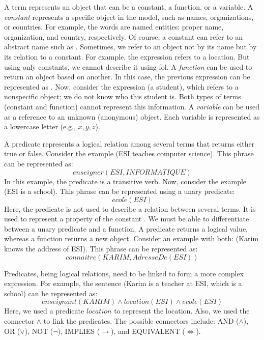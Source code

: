 \documentclass{KBook}
\begin{document}
A term represents an object that can be a constant, a function, or a variable. 
A \textit{constant} represents a specific object in the model, such as names, organizations, or countries.
For example, the words  are named entities: proper name, organization, and country, respectively.
Of course, a constant can refer to an abstract name such as .
Sometimes, we refer to an object not by its name but by its relation to a constant. 
For example, the expression  refers to a location. 
But using only constants, we cannot describe it using \ac{fol}. 
A \textit{function} can be used to return an object based on another. 
In this case, the previous expression can be represented as .
Now, consider the expression  (a student), which refers to a nonspecific object; we do not know who this student is. 
Both types of terms (constant and function) cannot represent this information. 
A \textit{variable} can be used as a reference to an unknown (anonymous) object. 
Each variable is represented as a lowercase letter (e.g., \(x, y, z\)).


A predicate represents a logical relation among several terms that returns either true or false.
Consider the example  (ESI teaches computer science).
This phrase can be represented as: 
\[enseigner(ESI, INFORMATIQUE)\]
In this example, the predicate is a transitive verb. 
Now, consider the example  (ESI is a school).
This phrase can be represented using a unary predicate:
\[ecole(ESI)\]
Here, the predicate is not used to describe a relation between several terms. 
It is used to represent a property of the constant . 
We must be able to differentiate between a unary predicate and a function. 
A predicate returns a logical value, whereas a function returns a new object.
Consider an example with both:  (Karim knows the address of ESI). 
This phrase can be represented as: 
\[connaitre(KARIM, AdresseDe(ESI))\]


Predicates, being logical relations, need to be linked to form a more complex expression. 
For example, the sentence  (Karim is a teacher at ESI, which is a school) can be represented as:
\[enseignant(KARIM) \wedge location(ESI) \wedge ecole(ESI)\]
Here, we used a predicate $location$ to represent the location. 
Also, we used the connector $\wedge$ to link the predicates. 
The possible connectors include: AND ($ \wedge $), OR ($ \vee $), NOT ($ \neg $), IMPLIES ($\rightarrow$), and EQUIVALENT ($ \Leftrightarrow $).
\end{document}
